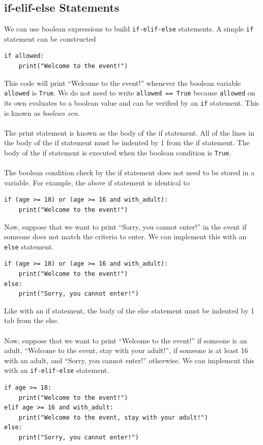 \documentclass{article}
\begin{document}
\subsection{if-elif-else Statements}
We can use boolean expressions to build \texttt{if-elif-else} statements. A simple \texttt{if} statement can be constructed
\begin{verbatim}
if allowed:
    print("Welcome to the event!")
\end{verbatim}
This code will print ``Welcome to the event!'' whenever the boolean variable \texttt{allowed} is \texttt{True}. We do not need to write \texttt{allowed == True} because \texttt{allowed} on its own evaluates to a boolean value and can be verified by an \texttt{if} statement. This is known as \textit{boolean zen}.\\\\
The print statement is known as the body of the if statement. All of the lines in the body of the if statement must be indented by 1 from the if statement. The body of the if statement is executed when the boolean condition is \texttt{True}.\\\\
The boolean condition check by the if statement does not need to be stored in a variable. For example, the above if statement is identical to
\begin{verbatim}
if (age >= 18) or (age >= 16 and with_adult):
    print("Welcome to the event!")
\end{verbatim}
Now, suppose that we want to print ``Sorry, you cannot enter!'' in the event if someone does not match the criteria to enter. We can implement this with an \texttt{else} statement.
\begin{verbatim}
if (age >= 18) or (age >= 16 and with_adult):
    print("Welcome to the event!")
else:
    print("Sorry, you cannot enter!")
\end{verbatim}
Like with an if statement, the body of the else statement must be indented by 1 tab from the else.\\\\
Now, suppose that we want to print ``Welcome to the event!'' if someone is an adult, ``Welcome to the event, stay with your adult!'', if someone is at least 16 with an adult, and ``Sorry, you cannot enter!'' otherwise. We can implement this with an \texttt{if-elif-else} statement.
\begin{verbatim}
if age >= 18:
    print("Welcome to the event!")
elif age >= 16 and with_adult:
    print("Welcome to the event, stay with your adult!")
else:
    print("Sorry, you cannot enter!")
\end{verbatim}
\end{document}
